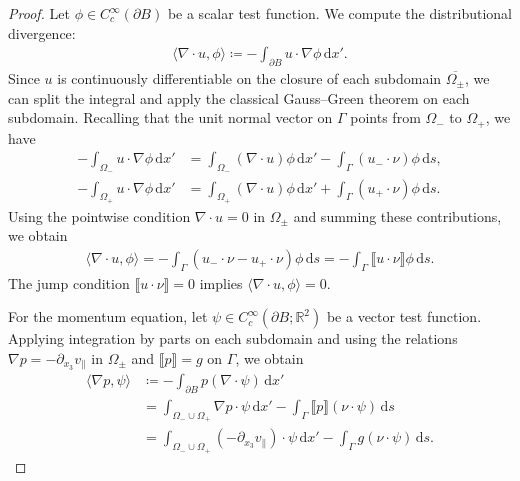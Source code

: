 \documentclass{article}
\theoremstyle{remark}
\theoremstyle{definition}
\numberwithin{equation}{section}
\begin{document}
\begin{proof}
    Let $\phi \in C_c^\infty(\partial B)$ be a scalar test function. We compute the distributional divergence:
    \begin{align*}
        \langle\nabla\cdot u,\phi\rangle \coloneqq -\int_{\partial B}u \cdot \nabla\phi\,\mathrm{d}x'.
    \end{align*}
    Since $u$ is continuously differentiable on the closure of each subdomain $\overline{\Omega_\pm}$, we can split the integral and apply the classical Gauss--Green theorem on each subdomain.
    Recalling that the unit normal vector on $\Gamma$ points from $\Omega_-$ to $\Omega_+$, we have
    \begin{align*}
        -\int_{\Omega_-}u\cdot\nabla\phi\,\mathrm{d}x'
        &= \int_{\Omega_-}(\nabla\cdot u)\phi\,\mathrm{d}x' - \int_\Gamma(u_-\cdot\nu)\phi\,\mathrm{d}s, \\
        -\int_{\Omega_+}u\cdot\nabla\phi\,\mathrm{d}x' 
        &= \int_{\Omega_+}(\nabla\cdot u)\phi\,\mathrm{d}x' + \int_\Gamma(u_+\cdot\nu)\phi\,\mathrm{d}s.
    \end{align*}
    Using the pointwise condition $\nabla\cdot u = 0$ in $\Omega_\pm$ and summing these contributions, we obtain
    \begin{align*}
        \langle\nabla\cdot u,\phi\rangle
        = -\int_\Gamma\left(u_-\cdot\nu - u_+\cdot\nu\right)\phi\,\mathrm{d}s
        = -\int_\Gamma\llbracket u\cdot\nu \rrbracket\phi\,\mathrm{d}s.
    \end{align*}
    The jump condition $\llbracket u\cdot\nu \rrbracket = 0$ implies $\langle\nabla\cdot u,\phi\rangle = 0$.

    For the momentum equation, let $\psi \in C_c^\infty(\partial B;\mathbb{R}^2)$ be a vector test function.
    Applying integration by parts on each subdomain and using the relations $\nabla p = -\partial_{x_3}v_\parallel$ in $\Omega_\pm$ and $\llbracket p \rrbracket = g$ on $\Gamma$, we obtain
    \begin{align*}
        \langle\nabla p,\psi\rangle
        &\coloneqq -\int_{\partial B}p(\nabla\cdot\psi)\,\mathrm{d}x' \\
        &= \int_{\Omega_-\cup\Omega_+}\nabla p\cdot\psi\,\mathrm{d}x' - \int_\Gamma \llbracket p \rrbracket (\nu \cdot \psi)\,\mathrm{d}s \\
        &= \int_{\Omega_-\cup\Omega_+} (-\partial_{x_3}v_\parallel) \cdot \psi\,\mathrm{d}x' - \int_\Gamma g(\nu \cdot \psi)\,\mathrm{d}s.
    \end{align*}


\end{proof}
\end{document}
